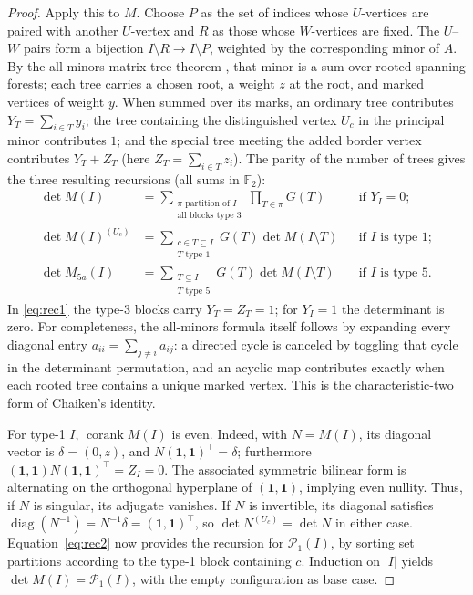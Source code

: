 \documentclass[11pt,a4paper]{article}
\theoremstyle{definition}
\newcommand{\FF}{\mathbb F_2}
\newcommand{\corank}{\operatorname{corank}}
\newcommand{\one}{\boldsymbol{1}}
\newcommand{\diag}{\operatorname{diag}}
\begin{document}
\begin{proof}
Apply this to $M$.  Choose $P$ as the set of indices whose
$U$-vertices are paired with another $U$-vertex and $R$ as
those whose $W$-vertices are fixed.  The $U$--$W$ pairs
form a bijection $I\setminus R\to I\setminus P$, weighted
by the corresponding minor of $A$.  By the all-minors
matrix-tree theorem \cite{Chaiken}, that minor is a sum over
rooted spanning forests; each tree carries a chosen root,
a weight $z$ at the root, and marked vertices of weight $y$.
When summed over its marks, an ordinary tree contributes
$Y_T=\sum_{i\in T}y_i$; the tree containing the distinguished
vertex $U_c$ in the principal minor contributes $1$;
and the special tree meeting the added border vertex
contributes $Y_T+Z_T$ (here $Z_T=\sum_{i\in T}z_i$).
The parity of the number of trees gives the three resulting
recursions (all sums in $\FF$):
\begin{align}
 \det M(I)&=\sum_{\substack{\pi\text{ partition of }I\\
                         \text{all blocks type 3}}}\prod_{T\in\pi}G(T)
                &&\text{if }Y_I=0;                                      \label{eq:rec1}\\
 \det M(I)^{(U_c)}
   &=\sum_{\substack{c\in T\subseteq I\\T\text{ type 1}}}
          G(T)\det M(I\setminus T)
                &&\text{if }I\text{ is type 1};                         \label{eq:rec2}\\
 \det M_{5a}(I)
   &=\sum_{\substack{T\subseteq I\\T\text{ type 5}}}
          G(T)\det M(I\setminus T)
                &&\text{if }I\text{ is type 5}.                         \label{eq:rec3}
\end{align}
In \eqref{eq:rec1} the type-3 blocks carry $Y_T=Z_T=1$;
for $Y_I=1$ the determinant is zero.  For completeness,
the all-minors formula itself follows by expanding every
diagonal entry $a_{ii}=\sum_{j\ne i}a_{ij}$: a directed
cycle is canceled by toggling that cycle in the determinant
permutation, and an acyclic map contributes exactly when
each rooted tree contains a unique marked vertex.
This is the characteristic-two form of Chaiken's identity.

For type-1 $I$, $\corank M(I)$ is even.  Indeed, with
$N=M(I)$, its diagonal vector is $\delta=(0,z)$,
and $N(\one,\one)^\top=\delta$; furthermore
$(\one,\one)N(\one,\one)^\top=Z_I=0$.
The associated symmetric bilinear form is alternating
on the orthogonal hyperplane of $(\one,\one)$, implying
even nullity.  Thus, if $N$ is singular, its adjugate
vanishes.  If $N$ is invertible, its diagonal satisfies
\(\diag(N^{-1})=N^{-1}\delta=(\one,\one)^\top\),
so $\det N^{(U_c)}=\det N$ in either case.
Equation~\eqref{eq:rec2} now provides the recursion for
$\mathcal P_1(I)$, by sorting set partitions according to
the type-1 block containing $c$.  Induction on $|I|$
yields $\det M(I)=\mathcal P_1(I)$, with the empty
configuration as base case.


\end{proof}
\end{document}
